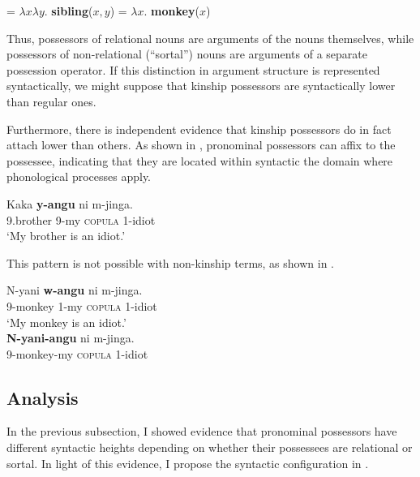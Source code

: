 \documentclass[output=paper,newtxmath,modfonts,nonflat,hidelinks]{langsci/langscibook}
\begin{document}
\ea\label{ex:pesetsky:lfkwakweli} \ea\label{ex:pesetsky:lfkwakwelia} {  = $\lambda x \lambda y$. \textbf{sibling}($x,y$) }
\ex\label{ex:pesetsky:lfkwakwelib} {  = $\lambda x.$ \textbf{monkey}($x$) \\ } \z \z

Thus, possessors of relational nouns are arguments of the nouns themselves, while possessors of non-relational (``sortal'') nouns are arguments of a separate possession operator. If this distinction in argument structure is represented syntactically, we might suppose that kinship possessors are syntactically lower than regular ones. 

Furthermore, there is independent evidence that kinship possessors do in fact attach lower than others. As shown in , pronominal possessors can affix to the possessee, indicating that they are located within syntactic the domain where phonological processes apply.

\ea\label{ex:pesetsky:kakayangu}  \ea\label{ex:pesetsky:kakayangua}{ \gll Kaka \textbf{y-angu} ni m-jinga. \\ \textsc{9}.brother \textsc{9}-my \textsc{copula} \textsc{1}-idiot \\ \glt `My brother is an idiot.'  \\}
 \z \z

This pattern is not possible with non-kinship terms, as shown in .

\ea\label{ex:pesetsky:nyaniwangu} 
\ea\label{ex:pesetsky:nyaniwangua}{ \gll N-yani \textbf{w-angu} ni m-jinga. \\ \textsc{9}-monkey \textsc{1}-my \textsc{copula} \textsc{1}-idiot \\ \glt `My monkey is an idiot.' \\ }
\ex\label{ex:pesetsky:nyaniwangub}{ \gll  \textbf{N-yani-angu} ni m-jinga. \\ \textsc{9}-monkey-my \textsc{copula} \textsc{1}-idiot \\ } \z \z

\subsection{Analysis}\label{sec:pesetsky:analysissubsection}

In the previous subsection, I showed evidence that pronominal possessors have different syntactic heights depending on whether their possessees are relational or sortal.  In light of this evidence, I propose the syntactic configuration in .
\end{document}
